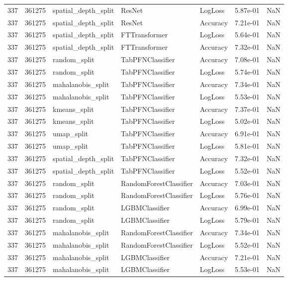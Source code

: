 \begin{tabular}{rrlllrr}
337 & 361275 & spatial\_depth\_split & ResNet & LogLoss & 5.87e-01 & NaN \\
337 & 361275 & spatial\_depth\_split & ResNet & Accuracy & 7.21e-01 & NaN \\
337 & 361275 & spatial\_depth\_split & FTTransformer & LogLoss & 5.64e-01 & NaN \\
337 & 361275 & spatial\_depth\_split & FTTransformer & Accuracy & 7.32e-01 & NaN \\
337 & 361275 & random\_split & TabPFNClassifier & Accuracy & 7.08e-01 & NaN \\
337 & 361275 & random\_split & TabPFNClassifier & LogLoss & 5.74e-01 & NaN \\
337 & 361275 & mahalanobis\_split & TabPFNClassifier & Accuracy & 7.34e-01 & NaN \\
337 & 361275 & mahalanobis\_split & TabPFNClassifier & LogLoss & 5.53e-01 & NaN \\
337 & 361275 & kmeans\_split & TabPFNClassifier & Accuracy & 7.37e-01 & NaN \\
337 & 361275 & kmeans\_split & TabPFNClassifier & LogLoss & 5.02e-01 & NaN \\
337 & 361275 & umap\_split & TabPFNClassifier & Accuracy & 6.91e-01 & NaN \\
337 & 361275 & umap\_split & TabPFNClassifier & LogLoss & 5.81e-01 & NaN \\
337 & 361275 & spatial\_depth\_split & TabPFNClassifier & Accuracy & 7.32e-01 & NaN \\
337 & 361275 & spatial\_depth\_split & TabPFNClassifier & LogLoss & 5.52e-01 & NaN \\
337 & 361275 & random\_split & RandomForestClassifier & Accuracy & 7.03e-01 & NaN \\
337 & 361275 & random\_split & RandomForestClassifier & LogLoss & 5.76e-01 & NaN \\
337 & 361275 & random\_split & LGBMClassifier & Accuracy & 6.99e-01 & NaN \\
337 & 361275 & random\_split & LGBMClassifier & LogLoss & 5.79e-01 & NaN \\
337 & 361275 & mahalanobis\_split & RandomForestClassifier & Accuracy & 7.34e-01 & NaN \\
337 & 361275 & mahalanobis\_split & RandomForestClassifier & LogLoss & 5.52e-01 & NaN \\
337 & 361275 & mahalanobis\_split & LGBMClassifier & Accuracy & 7.21e-01 & NaN \\
337 & 361275 & mahalanobis\_split & LGBMClassifier & LogLoss & 5.53e-01 & NaN \\

\end{tabular}
